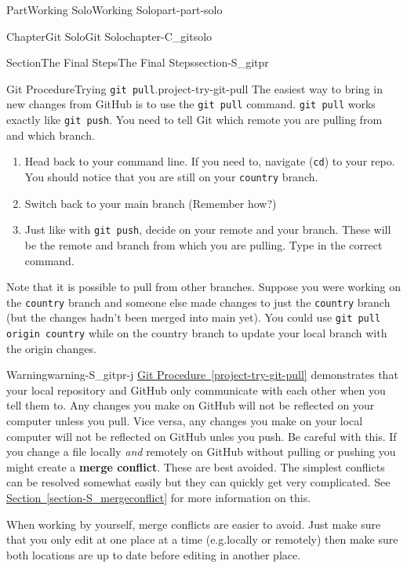 \documentclass[oneside,10pt,]{book}
\newcommand{\xreffont}{\relax}
\newcommand{\mono}[1]{\texttt{#1}}
\newcommand{\terminology}[1]{\textbf{#1}}
\begin{document}
\begin{partptx}{Part}{Working Solo}{}{Working Solo}{}{}{part-part-solo}
\begin{chapterptx}{Chapter}{Git Solo}{}{Git Solo}{}{}{chapter-C_gitsolo}
\begin{sectionptx}{Section}{The Final Steps}{}{The Final Steps}{}{}{section-S_gitpr}
\begin{project}{Git Procedure}{Trying \mono{git pull}.}{project-try-git-pull}%
%
%
The easiest way to bring in new changes from GitHub is to use the \mono{git pull} command. \mono{git pull} works exactly like \mono{git push}. You need to tell Git which remote you are pulling from and which branch.%
\begin{enumerate}[font=\bfseries,label=(\alph*),ref=\alph*]%
\item{}Head back to your command line. If you need to, navigate (\mono{cd}) to your repo. You should notice that you are still on your \mono{country} branch.%
\item{}Switch back to your main branch (Remember how?)%
\item{}Just like with \mono{git push}, decide on your remote and your branch. These will be the remote and branch from which you are pulling. Type in the correct command.%
\end{enumerate}%
Note that it is possible to pull from other branches. Suppose you were working on the \mono{country} branch and someone else made changes to just the \mono{country} branch (but the changes hadn't been merged into main yet). You could use \mono{git pull origin country} while on the country branch to update your local branch with the origin changes.%
\end{project}%
\begin{warning}{Warning}{}{warning-S_gitpr-j}%
%
\hyperref[project-try-git-pull]{Git Procedure~{\xreffont\ref{project-try-git-pull}}} demonstrates that your local repository and GitHub only communicate with each other when you tell them to. Any changes you make on GitHub will not be reflected on your computer unless you pull. Vice versa, any changes you make on your local computer will not be reflected on GitHub unles you push. Be careful with this. If you change a file locally \emph{and} remotely on GitHub without pulling or pushing you might create a \terminology{merge conflict}. These are best avoided. The simplest conflicts can be resolved somewhat easily but they can quickly get very complicated. See \hyperref[section-S_mergeconflict]{Section~{\xreffont\ref{section-S_mergeconflict}}} for more information on this.%
\par
When working by yourself, merge conflicts are easier to avoid. Just make sure that you only edit at one place at a time (e.g.\@ locally or remotely) then make sure both locations are up to date before editing in another place.%

\end{warning}
\end{sectionptx}
\end{chapterptx}
\end{partptx}
\end{document}
